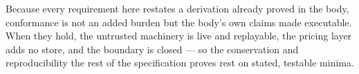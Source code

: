 Because every requirement here restates a derivation already proved in the body,
conformance is not an added burden but the body's own claims made executable. When they
hold, the untrusted machinery is live and replayable, the pricing layer adds no store, and
the boundary is closed --- so the conservation and reproducibility the rest of the
specification proves rest on stated, testable minima.
